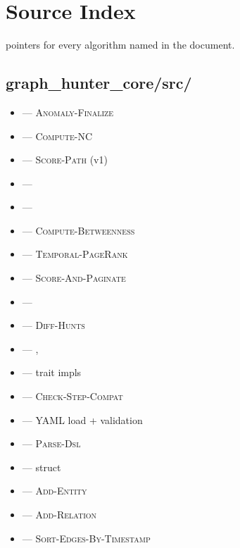 \chapter{Source Index}
\label{app:source}

 pointers for every algorithm named in the document.

\section{graph\_hunter\_core/src/}

\begin{itemize}\setlength{\itemsep}{0pt}
    \item {} --- \textsc{Anomaly-Finalize}
    \item {} --- \textsc{Compute-NC}
    \item {} --- \textsc{Score-Path} (v1)
    \item {} --- 
    \item {} --- 
    \item {} --- \textsc{Compute-Betweenness}
    \item {} --- \textsc{Temporal-PageRank}
    \item {} --- \textsc{Score-And-Paginate}
    \item {} --- 
    \item {} --- \textsc{Diff-Hunts}
    \item {} --- , 
    \item {} --- trait impls
    \item {} --- \textsc{Check-Step-Compat}
    \item {} --- YAML load + validation
    \item {} --- \textsc{Parse-Dsl}
    \item {} --- \Graph{} struct
    \item {} --- \textsc{Add-Entity}
    \item {} --- \textsc{Add-Relation}
    \item {} --- \textsc{Sort-Edges-By-Timestamp}

\end{itemize}
